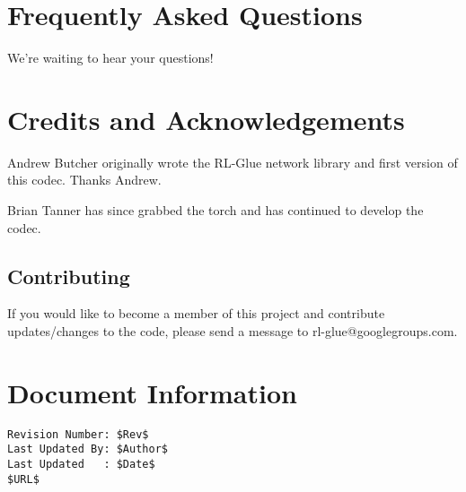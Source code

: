 \documentclass[11pt]{article}
\begin{document}
\section{Frequently Asked Questions}
We're waiting to hear your questions!

\section{Credits and Acknowledgements}
Andrew Butcher originally wrote the RL-Glue network library and first version of this codec.  Thanks Andrew.

Brian Tanner has since grabbed the torch and has continued to develop the codec.

\subsection{Contributing}
If you would like to become a member of this project and contribute updates/changes to the code, please send a message to rl-glue@googlegroups.com.


\section*{Document Information}
\begin{verbatim}
Revision Number: $Rev$
Last Updated By: $Author$
Last Updated   : $Date$
$URL$
\end{verbatim}
\end{document}
